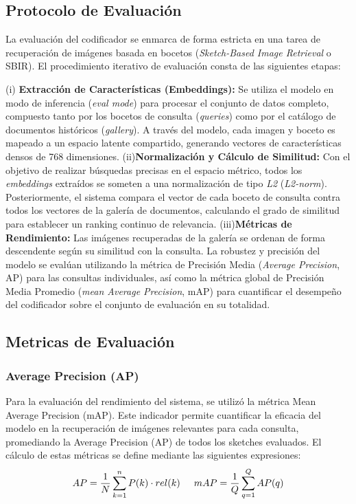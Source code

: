 \documentclass[11pt]{article}
\begin{document}
\subsection{Protocolo de Evaluación}
La evaluación del codificador se enmarca de forma estricta en una tarea de recuperación de imágenes basada en bocetos (\textit{Sketch-Based Image Retrieval} o SBIR). El procedimiento iterativo de evaluación consta de las siguientes etapas:

(i) \textbf{Extracción de Características (Embeddings):} Se utiliza el modelo en modo de inferencia (\textit{eval mode}) para procesar el conjunto de datos completo, compuesto tanto por los bocetos de consulta (\textit{queries}) como por el catálogo de documentos históricos (\textit{gallery}). A través del modelo, cada imagen y boceto es mapeado a un espacio latente compartido, generando vectores de características densos de 768 dimensiones. (ii)\textbf{Normalización y Cálculo de Similitud:} Con el objetivo de realizar búsquedas precisas en el espacio métrico, todos los \textit{embeddings} extraídos se someten a una normalización de tipo \textit{L2} (\textit{L2-norm}). Posteriormente, el sistema compara el vector de cada boceto de consulta contra todos los vectores de la galería de documentos, calculando el grado de similitud para establecer un ranking continuo de relevancia. (iii)\textbf{Métricas de Rendimiento:} Las imágenes recuperadas de la galería se ordenan de forma descendente según su similitud con la consulta. La robustez y precisión del modelo se evalúan utilizando la métrica de Precisión Media (\textit{Average Precision}, AP) para las consultas individuales, así como la métrica global de Precisión Media Promedio (\textit{mean Average Precision}, mAP) para cuantificar el desempeño del codificador sobre el conjunto de evaluación en su totalidad.

\subsection{Metricas de Evaluación}

\subsubsection{Average Precision (AP)}

Para la evaluación del rendimiento del sistema, se utilizó la métrica Mean Average Precision (mAP). Este indicador permite cuantificar la eficacia del modelo en la recuperación de imágenes relevantes para cada consulta, promediando la Average Precision (AP) de todos los sketches evaluados. El cálculo de estas métricas se define mediante las siguientes expresiones:
\begin{equation}
    AP = \frac{1}{N} \sum_{k=1}^{n} P(k) \cdot rel(k) \hspace{0.5cm} mAP = \frac{1}{Q} \sum_{q=1}^{Q} AP(q)
\end{equation}
\end{document}
